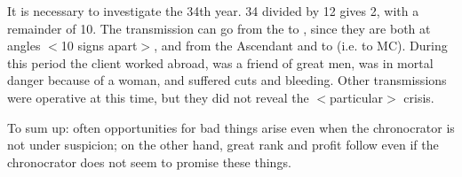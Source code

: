 It is necessary to investigate the 34th year. 34 divided by 12 gives 2, with a remainder of 10. The transmission can go from the \Moon\xspace to \Mars, since they are both at angles $<$10 signs apart$>$, and from the Ascendant and \Mars\xspace to \Taurus\xspace (i.e. to MC). During this period the client worked abroad, was a friend of great men, was in mortal danger because of a woman, and suffered cuts and bleeding. Other transmissions were operative at this time, but they did not reveal the $<$particular$>$ crisis.

To sum up: often opportunities for bad things arise even when the chronocrator is not under suspicion; on the other hand, great rank and profit follow even if the chronocrator does not seem to promise these
things.


\newpage